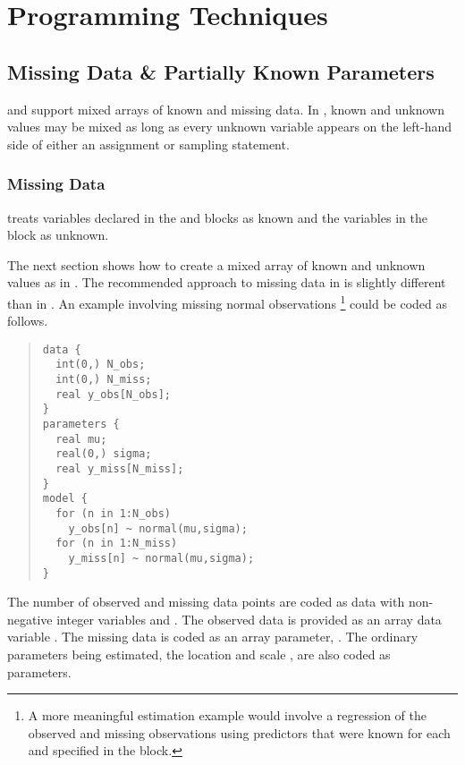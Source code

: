 \part{Programming Techniques}\label{programming-techniques.part}



\chapter{Missing Data \& Partially Known Parameters}

\noindent
\BUGS and \R support mixed arrays of known and missing data.  In
\BUGS, known and unknown values may be mixed as long as every unknown
variable appears on the left-hand side of either an assignment or
sampling statement.  

\section{Missing Data}


\Stan treats variables declared in the  and
 blocks as known and the variables in the
 block as unknown.

The next section shows how to create a mixed array of known and
unknown values as in \BUGS.  The recommended approach to missing data
in \Stan is slightly different than in \BUGS.  An example involving
missing normal observations%
%
\footnote{A more meaningful estimation example would involve a
  regression of the observed and missing observations using predictors
  that were known for each and specified in the  block.}
%
could be coded as follows.
%
\begin{quote}
\begin{Verbatim}
data {
  int(0,) N_obs;
  int(0,) N_miss;
  real y_obs[N_obs];
}
parameters {
  real mu;
  real(0,) sigma;
  real y_miss[N_miss];
}
model {
  for (n in 1:N_obs)
    y_obs[n] ~ normal(mu,sigma);
  for (n in 1:N_miss)
    y_miss[n] ~ normal(mu,sigma);
}
\end{Verbatim}
\end{quote}
%
The number of observed and missing data points are coded as data with
non-negative integer variables  and .  The
observed data is provided as an array data variable .
The missing data is coded as an array parameter, .  The
ordinary parameters being estimated, the location  and scale
, are also coded as parameters.

